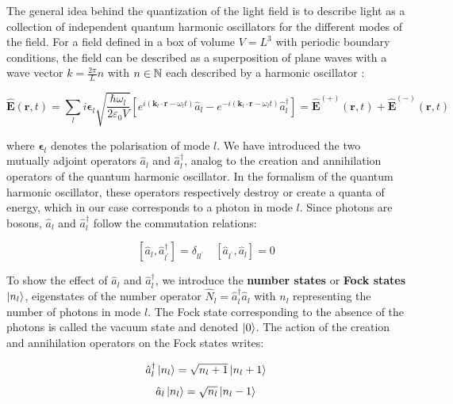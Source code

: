 The general idea behind the quantization of the light field is to describe light as a collection of independent quantum harmonic oscillators for the different modes of the field. For a field defined in a box of volume $V=L^3$ with periodic boundary conditions, the field can be described as a superposition of plane waves with a wave vector $k=\frac{2 \pi}{L} n$ with $n \in \mathbb{N}$ each described by a harmonic oscillator \cite{walls2008}:

\begin{equation}
    \hat{\bm{E}}(\bm{r}, t)=\sum_{l} i \bm{\epsilon}_{l} \sqrt{\frac{\hbar \omega_l}{2 \varepsilon_0 V}} \left[e^{i (\bm{k}_{l} \cdot \bm{r} - \omega_l t)} \hat{a}_{l}-e^{-i (\bm{k}_{l} \cdot \bm{r} - \omega_l t)} \hat{a}_{l}^{\dagger}\right]  = \hat{\bm{E}}^{(+)}(\bm{r}, t)+\hat{\bm{E}}^{(-)}(\bm{r}, t)
\end{equation}

\noindent where $\bm{\epsilon}_{l}$ denotes the polarisation of mode $l$. We have introduced the two mutually adjoint operators $\hat{a}_{l}$ and $\hat{a}_{l}^{\dagger}$, analog to the creation and annihilation operators of the quantum harmonic oscillator. In the formalism of the quantum harmonic oscillator, these operators respectively destroy or create a quanta of energy, which in our case corresponds to a photon in mode $l$. Since photons are bosons, $\hat{a}_{l}$ and $\hat{a}_{l}^{\dagger}$ follow the commutation relations:

\begin{equation}
    \left[\hat{a}_{l}, \hat{a}_{l^{\prime}}^{\dagger}\right]=\delta_{l l^{\prime}} \quad\left[\hat{a}_{l^{\prime}}, \hat{a}_{l}\right]=0
\end{equation}

To show the effect of $\hat{a}_{l}$ and $\hat{a}_{l}^{\dagger}$, we introduce the \textbf{number states} or \textbf{Fock states} $\ket{n_l}$, eigenstates of the number operator $\hat{N}_l = \hat{a}_{l}^{\dagger} \hat{a}_{l}$ with $n_l$ representing the number of photons in mode $l$. The Fock state corresponding to the absence of the photons is called the vacuum state and denoted $\ket{0}$. The action of the creation and annihilation operators on the Fock states writes:



\begin{equation}
    \hat{a}_{l}^{\dagger} \ket{n_l}=\sqrt{n_l+1}\left|n_l+1\right\rangle
\end{equation}
\begin{equation}
    \hat{a}_{l} \ket{n_l}=\sqrt{n_l}\left|n_l-1\right\rangle
\end{equation}

